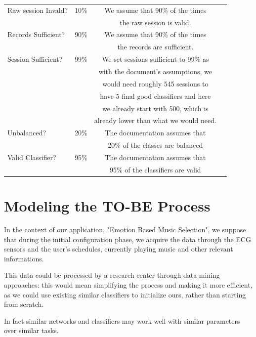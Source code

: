 \begin{table}[H]
\begin{tabularx}{\textwidth}{|X|c|c|c|}
    \hline
    Raw session Invald? & 10\% & We assume that 90\% of the times
    \\ & & the raw session is valid.\\
    \hline
    Records Sufficient? & 90\% & We assume that 90\% of the times
    \\ & & the records are sufficient.\\
    \hline
    Session Sufficient? & 99\% & We set sessions sufficient to 99\% as
    \\ & & with the document's assumptions, we 
    \\ & & would need roughly 545 sessions to 
    \\ & & have 5 final good classifiers and here
    \\ & &  we already start with 500, which is
    \\ & & already lower than what we would need.\\
    \hline
    Unbalanced? & 20\% & The documentation assumes that
    \\ & &  20\% of the classes are balanced\\
    \hline
    Valid Classifier? & 95\% & The documentation assumes that
    \\ & &  95\% of the classifiers are valid\\
    \hline

\end{tabularx}
\end{table}


\section{Modeling the TO-BE Process}
\label{sec:modeling_to_be_processing}

In the context of our application, "Emotion Based Music Selection", we suppose that during the initial configuration phase, we acquire the data through the ECG sensors and the user's schedules, currently playing music and other relevant informations.

This data could be processed by a research center through data-mining approaches: this would mean simplifying the process and making it more efficient, as we could use existing similar classifiers to initialize ours, rather than starting from scratch.

In fact similar networks and classifiers may work well with similar parameters over similar tasks.

